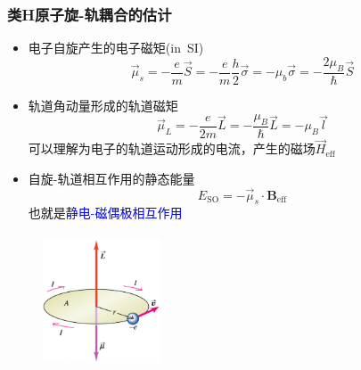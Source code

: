 {\frame
{
	\frametitle{类\textrm{H}原子旋-轨耦合的估计}
\begin{minipage}{0.58\textwidth}
	\begin{itemize}
		\item 电子自旋产生的电子磁矩\textrm{(in~SI)}
			\begin{displaymath}
				\vec\mu_s=-\dfrac{e}{m}\vec S=-\dfrac{e}{m}\dfrac{h}2\vec\sigma=-\mu_b\vec\sigma=-\dfrac{2\mu_B}{\hbar}\vec S
			\end{displaymath}
		\item 轨道角动量形成的轨道磁矩
			\begin{displaymath}
				\vec\mu_L=-\dfrac{e}{2m}\vec L=-\dfrac{\mu_B}{\hbar}\vec L=-\mu_B\vec l
			\end{displaymath}
			可以理解为电子的轨道运动形成的电流，产生的磁场$\vec H_{\mathrm{eff}}$
		\item 自旋-轨道相互作用的静态能量
			\begin{displaymath}
				E_{\mathrm{SO}}=-\vec\mu_s\cdot\mathbf{B}_{\mathrm{eff}}
			\end{displaymath}
			也就是\textcolor{blue}{静电-磁偶极相互作用}
	\end{itemize}
\end{minipage}
\begin{minipage}{0.40\textwidth}
\begin{figure}[h!]
\centering
\vspace{+0.3in}
\includegraphics[height=1.55in,width=1.38in,viewport=0 0 760 800,clip]{Figures/SOC_spin-orbit.png}
\label{SOC_spin-orbit}
\end{figure}
\end{minipage}
}

}
